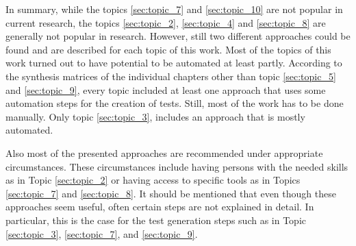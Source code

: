 In summary, while the topics \ref{sec:topic_7} and \ref{sec:topic_10} are not popular in current research, the topics \ref{sec:topic_2}, \ref{sec:topic_4} and \ref{sec:topic_8} are generally not popular in research. However, still two different approaches could be found and are described for each topic of this work. Most of the topics of this work turned out to have potential to be automated at least partly. According to the synthesis matrices of the individual chapters other than topic \ref{sec:topic_5} and \ref{sec:topic_9}, every topic included at least one approach that uses some automation steps for the creation of tests. Still, most of the work has to be done manually. Only topic \ref{sec:topic_3},  includes an approach that is mostly automated.

Also most of the presented approaches are recommended under appropriate circumstances. These circumstances include having persons with the needed skills as in Topic \ref{sec:topic_2} or having access to specific tools as in Topics \ref{sec:topic_7} and \ref{sec:topic_8}. It should be mentioned that even though these approaches seem useful, often certain steps are not explained in detail. In particular, this is the case for the test generation steps such as in Topic \ref{sec:topic_3}, \ref{sec:topic_7}, and \ref{sec:topic_9}. 
